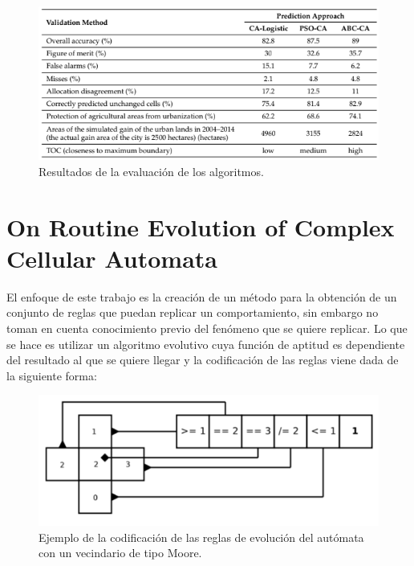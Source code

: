 \begin{figure}[h]
	\centering
	\includegraphics[width=\linewidth]{fig/results}
	\caption{Resultados de la evaluación de los algoritmos. }
	\label{fig:results}
\end{figure}

\section{On Routine Evolution of Complex Cellular Automata}

El enfoque de este trabajo \citep{bidlo2016routine} es la creación de un método para la obtención de un conjunto de reglas que puedan replicar un comportamiento, sin embargo no toman en cuenta conocimiento previo del fenómeno que se quiere replicar. Lo que se hace es utilizar un algoritmo evolutivo cuya función de aptitud es dependiente del resultado al que se quiere llegar y la codificación de las reglas viene dada de la siguiente forma:

\begin{figure}[h]
	\centering
	\includegraphics[width=\linewidth]{fig/rulesencoding}
	\caption{Ejemplo de la codificación de las reglas de evolución del autómata con un vecindario de tipo Moore.}
	\label{fig:results}
\end{figure}
